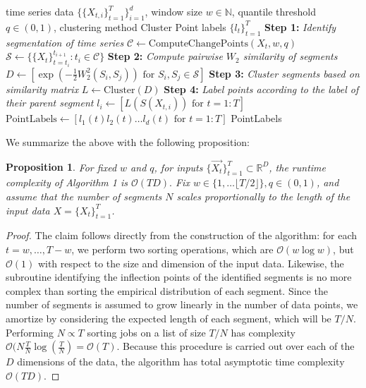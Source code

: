 \documentclass{article}
\newtheorem{proposition}{Proposition}
\newcommand{\R}{\mathbb{R}}
\begin{document}
\begin{algorithm}
\label{GeneralStepAlg}
\caption{Metastable State Identification Procedure (IdentifyStates)}
\begin{algorithmic}[3]
\Require time series data \(\{\{X_{t,i}\}_{t=1}^{T}\}_{i=1}^d\), window size $w \in \mathbb{N}$, quantile threshold $q \in (0,1)$, clustering method Cluster
\Ensure Point labels \(\{l_t\}_{t=1}^{T}\)
\State \textbf{Step 1: } \textit{Identify segmentation of time series}
\State \(\mathcal{C} \gets \text{ComputeChangePoints}(X_t, w, q)\)
\State \(\mathcal{S} \gets \{\{X_t\}_{t=t_i}^{t_{i+1}} : t_i \in \mathcal{C}\}\)
\State \textbf{Step 2: } \textit{Compute pairwise \(W_2\) similarity of segments}
\State \(D \gets \left[\exp\left(-\frac{1}{2}W_2^2(S_i, S_j)\right)\text{ for } S_i, S_j \in \mathcal{S}\right ]\) 
\State \textbf{Step 3: } \textit{Cluster segments based on similarity matrix}
\State \(L \gets \text{Cluster}(D)\)
\State \textbf{Step 4: } \textit{Label points according to the label of their parent segment}
\State \(l_i \gets [L(S(X_{t,i})) \text{ for } t=1:T]\)
\EndFor
\State \(\text{PointLabels}\gets [l_1(t)l_2(t)\dots l_d(t) \text{ for } t=1:T]\) 
\State \Return PointLabels
\end{algorithmic}
\end{algorithm}

We summarize the above with the following proposition:
\begin{proposition}
For fixed \(w\) and \(q\), for inputs \(\{\vec{X_{t}}\}_{t=1}^T \subset \R^D\), the runtime complexity of Algorithm 1 is \(\mathcal{O}(TD).\)
{Fix \(w \in \{1, \dots \lfloor T/2\rfloor\}, q \in (0,1)\)}, and assume that the number of segments \(N\) scales proportionally to the length of the input data \(X = \{X_t\}_{t=1}^T\).
\end{proposition}
\begin{proof}
    The claim follows directly from the construction of the algorithm: for each \(t = w, \dots, T - w\), we perform two sorting operations, which are \(\mathcal{O}(w\log w)\), but \(\mathcal{O}(1)\) with respect to the size and dimension of the input data. Likewise, the subroutine identifying the inflection points of the identified segments is no more complex than sorting the empirical distribution of each segment. Since the number of segments is assumed to grow linearly in the number of data points, we amortize by considering the expected length of each segment, which will be \(T/N\). Performing \(N \propto T\) sorting jobs on a list of size \(T/N\) has complexity \(\mathcal{O}(N\frac{T}{N}\log(\frac{T}{N}) = \mathcal{O}(T)\). Because this procedure is carried out over each of the \(D\) dimensions of the data, the algorithm has total asymptotic time complexity \(\mathcal{O}(TD).\)
\end{proof}
\end{document}
